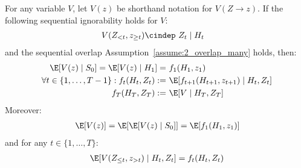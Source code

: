 \begin{lemma}\label{lem:g-formula_many} For any variable $V$, let $V(z)$ be shorthand notation for $V(Z\to z)$. If the following sequential ignorability holds for $V$:
\begin{align*}
    V(Z_{<t}, z_{\geq t}) \cindep~& Z_t \mid H_t
\end{align*}
and the sequential overlap Assumption~\ref{assume:2_overlap_many} holds, then:
\begin{align*}
\E[V(z) \mid S_0] = \E[V(z) \mid H_1]
=~& f_1(H_1, z_1)\\
\forall t\in \{1,\ldots, T-1\}: f_t(H_t, Z_t) :=~& \E[f_{t+1}(H_{t+1}, z_{t+1})\mid H_t, Z_t]\\
f_{T}(H_T, Z_T) :=~& \E[V\mid H_T, Z_T]
\end{align*}
Moreover:
\begin{align*}
\E[V(z)] = \E[\E[V(z)\mid S_0]] = \E[f_1(H_1, z_1)]
\end{align*}
and for any $t\in \{1, \ldots, T\}$:
\begin{align}\label{eqn:middle-step-g-formula}
    \E[V(Z_{\leq t}, z_{> t})\mid H_t, Z_t] = f_t(H_t, Z_t)
\end{align}
\end{lemma}
